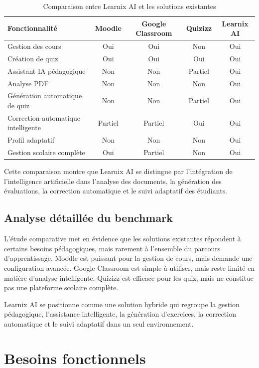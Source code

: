 \documentclass[12pt,a4paper]{report}
\begin{document}
\begin{table}[H]
\centering
\caption{Comparaison entre Learnix AI et les solutions existantes}
\begin{tabular}{|m{4cm}|c|c|c|c|}
\hline
Fonctionnalité & Moodle & Google Classroom & Quizizz & Learnix AI \\
\hline
Gestion des cours & Oui & Oui & Non & Oui \\
\hline
Création de quiz & Oui & Oui & Oui & Oui \\
\hline
Assistant IA pédagogique & Non & Non & Partiel & Oui \\
\hline
Analyse PDF & Non & Non & Non & Oui \\
\hline
Génération automatique de quiz & Non & Non & Partiel & Oui \\
\hline
Correction automatique intelligente & Partiel & Partiel & Oui & Oui \\
\hline
Profil adaptatif & Non & Non & Non & Oui \\
\hline
Gestion scolaire complète & Oui & Partiel & Non & Oui \\
\hline
\end{tabular}
\end{table}

Cette comparaison montre que Learnix AI se distingue par l'intégration de l'intelligence artificielle dans l'analyse des documents, la génération des évaluations, la correction automatique et le suivi adaptatif des étudiants.

\subsection{Analyse détaillée du benchmark}

L'étude comparative met en évidence que les solutions existantes répondent à
certains besoins pédagogiques, mais rarement à l'ensemble du parcours
d'apprentissage. Moodle est puissant pour la gestion de cours, mais demande une
configuration avancée. Google Classroom est simple à utiliser, mais reste limité
en matière d'analyse intelligente. Quizizz est efficace pour les quiz, mais ne
constitue pas une plateforme scolaire complète.

Learnix AI se positionne comme une solution hybride qui regroupe la gestion
pédagogique, l'assistance intelligente, la génération d'exercices, la correction
automatique et le suivi adaptatif dans un seul environnement.

\section{Besoins fonctionnels}
\end{document}
